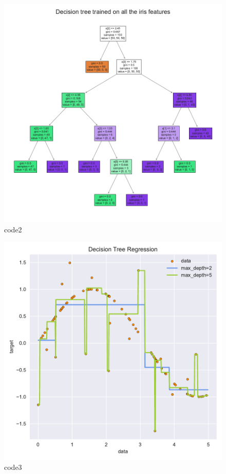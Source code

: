 \begin{figure}[htbp]
	\centering
	\includegraphics[width=14cm]{codeimage/code2}
	\caption{code2}
	\label{code2}
\end{figure}

\begin{PythonCode}\label{例3}
	
\end{PythonCode}

\begin{figure}[htbp]
	\centering
	\includegraphics[width=14cm]{codeimage/code3}
	\caption{code3}
	\label{code3}
\end{figure}

